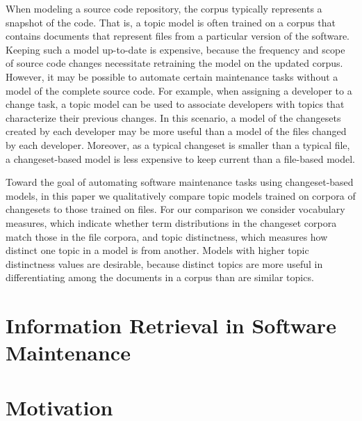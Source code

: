 When modeling a source code repository, the corpus typically represents
a snapshot of the code. That is, a topic model is often trained on a
corpus that contains documents that represent files from a particular
version of the software. Keeping such a model up-to-date is expensive,
because the frequency and scope of source code changes necessitate
retraining the model on the updated corpus. However, it may be possible
to automate certain maintenance tasks without a model of the complete
source code. For example, when assigning a developer to a change task, a
topic model can be used to associate developers with topics that
characterize their previous changes. In this scenario, a model of the
changesets created by each developer may be more useful than a model of
the files changed by each developer. Moreover, as a typical changeset is
smaller than a typical file, a changeset-based model is less expensive
to keep current than a file-based model.

Toward the goal of automating software maintenance tasks using
changeset-based models, in this paper we qualitatively compare topic
models trained on corpora of changesets to those trained on files. For
our comparison we consider vocabulary measures, which indicate whether
term distributions in the changeset corpora match those in the file
corpora, and topic
distinctness,
which measures how distinct one topic in a model is from another. Models
with higher topic distinctness values are desirable, because distinct
topics are more useful in differentiating among the documents in a
corpus than are similar topics.

\section{Information Retrieval in Software
Maintenance}\label{information-retrieval-in-software-maintenance}

\section{Motivation}\label{motivation}

